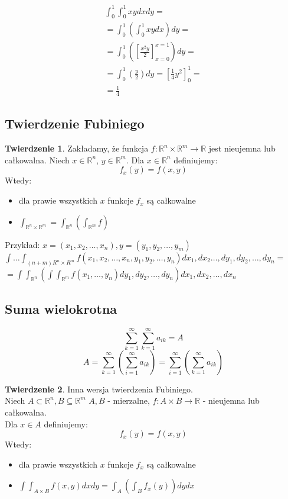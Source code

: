 \documentclass{article}
\theoremstyle{definition}
\theoremstyle{definition}
\newtheorem{tw}{Twierdzenie}[subsection]
\theoremstyle{definition}
\theoremstyle{definition}
\theoremstyle{definition}
\theoremstyle{definition}
\theoremstyle{definition}
\begin{document}
\begin{align}
    \int_{0}^{1} \int_{0}^{1} xy dx dy =\\
    =\int_{0}^{1} \left(\int_{0}^{1} xy dx \right) dy=\\
    =\int_{0}^{1} \left(\left[\frac{x^2y}{2}\right]_{x=0}^{x=1}\right) dy=\\
    =\int_{0}^{1} \left(\frac{y}{2}\right) dy = \left[\frac{1}{4} y^2\right]_{0}^{1}=\\
    =\frac{1}{4} 
\end{align}

\subsection{Twierdzenie Fubiniego}

\begin{tw}
    Zakładamy, że funkcja $f:\mathbb{R}^n \times \mathbb{R}^m \rightarrow \mathbb{R}$
    jest nieujemna lub całkowalna. Niech $x\in\mathbb{R}^n$, $y\in\mathbb{R}^m$. Dla $x\in\mathbb{R}^n$ definiujemy:
    \[f_x(y) = f(x,y)\]
    Wtedy:
    \begin{itemize}
        \item dla prawie wszystkich $x$ funkcje $f_x$ są całkowalne
        \item $\int_{\mathbb{R}^n\times\mathbb{R}^m} = \int_{\mathbb{R}^n} \left(\int_{\mathbb{R}^m} f\right)$
    \end{itemize}
\end{tw}

Przykład:
$x=(x_1,x_2,\dots,x_n), y=(y_1,y_2,\dots, y_m)$\\
$\int \dots \int_{(n+m) R^n\times R^m} f(x_1,x_2,\dots,x_n,y_1,y_2,\dots,y_n) dx_1, dx_2 \dots, dy_1, dy_2, \dots, dy_n =$\\
$=\int \int_{\mathbb{R}^n} \left(\int \int_{\mathbb{R}^m} f(x_1,\dots, y_n) dy_1, dy_2, \dots, dy_n\right) dx_1, dx_2, \dots, dx_n$

\subsection{Suma wielokrotna}
\[\sum_{k=1}^{\infty}\sum_{k=1}^{\infty} a_{ik} = A\]
\[A=\sum_{k=1}^{\infty}\left(\sum_{i=1}^{\infty} a_{ik}\right)= \sum_{i=1}^{\infty}\left(\sum_{k=1}^{\infty} a_{ik}\right)\]

\begin{tw}
    Inna wersja twierdzenia Fubiniego.\\
    Niech $A\subset \mathbb{R}^n, B\subseteq \mathbb{R}^m$
    $A, B$ - mierzalne,
    $f: A\times B \rightarrow \mathbb{R}$ - nieujemna lub całkowalna.\\
    Dla $x\in A$ definiujemy:
    \[f_x(y) = f(x,y)\]
    Wtedy:
    \begin{itemize}
        \item dla prawie wszystkich $x$ funkcje $f_x$ są całkowalne
        \item $\int \int_{A\times B} f(x,y) dx dy = \int_A \left(\int_B f_x(y) \right) dy dx$
    \end{itemize}
\end{tw}
\end{document}
